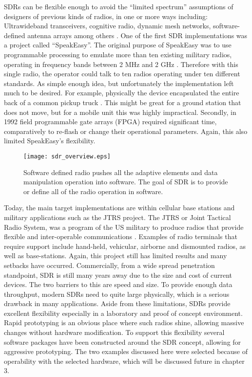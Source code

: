 SDRs can be flexible enough to avoid the ``limited spectrum'' assumptions of designers of previous kinds of radios, in one or more ways including: Ultrawideband transceivers, cognitive radio, dynamic mesh networks, software-defined antenna arrays among others \cite{22}.  One of the first SDR implementations was a project called ``SpeakEasy''.  The original purpose of SpeakEasy was to use programmable processing to emulate more than ten existing military radios, operating in frequency bands between 2 MHz and 2 GHz \cite{23}.  Therefore with this single radio, the operator could talk to ten radios operating under ten different standards.  As simple enough idea, but unfortunately the implementation left much to be desired.  For example, physically the device encapsulated the entire back of a common pickup truck \cite{23}.  This might be great for a ground station that does not move, but for a mobile unit this was highly impractical.  Secondly, in 1992 field programmable gate arrays (FPGA) required significant time, comparatively to re-flash or change their operational parameters.  Again, this also limited SpeakEasy's flexibility.\\

\begin{figure}\label{sdr_overview}
\centering
\texttt{[image: sdr\_overview.eps]}
\caption{Software defined radio pushes all the adaptive elements and data manipulation operation into software.  The goal of SDR is to provide or define all of the radio operation in software.}
\end{figure}

Today, the main target implementations are within cellular base stations and military applications such as the JTRS project.  The JTRS or Joint Tactical Radio System, was a program of the US military to produce radios that provide flexible and inter-operable communications \cite{24}. Examples of radio terminals that require support include hand-held, vehicular, airborne and dismounted radios, as well as base-stations\cite{24}.  Again, this project still has limited results and many setbacks have occurred.  Commercially, from a wide spread penetration standpoint, SDR is still many years away due to the size and cost of current devices.  The two barriers to this are speed and size.  To provide enough data throughput, modern SDRs need to quite large physically, which is a serious drawback in many applications.   Aside from these limitations, SDRs provide excellent flexibility especially in a laboratory and proof of concept environment.  Rapid prototyping is an obvious place where such radios shine, allowing massive changes without hardware modification.  To support this flexibility several software packages have been constructed around the SDR concept, allowing for aggressive prototyping.  The two examples discussed here were selected because of operability with the selected hardware, which will be discussed future in chapter 3.\\

